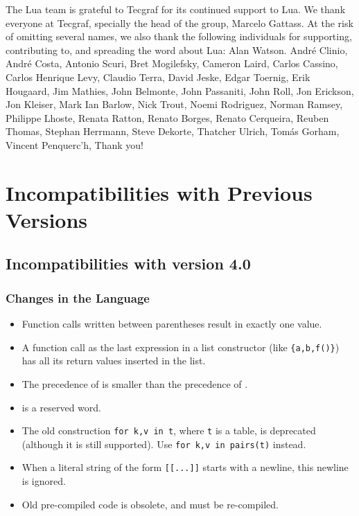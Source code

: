 \documentclass[11pt,twoside]{article}
\makeatletter
\def\tecgraf{{\sf Tecgraf}}
\newcommand{\Index}[1]{#1\index{#1@{\lowercase{#1}}}}
\makeatother
\begin{document}
The Lua team is grateful to \tecgraf{} for its continued support to Lua.
We thank everyone at \tecgraf{},
specially the head of the group, Marcelo Gattass.
At the risk of omitting several names,
we also thank the following individuals for supporting,
contributing to, and spreading the word about Lua:
Alan Watson.
Andr\'e Clinio,
Andr\'e Costa,
Antonio Scuri,
Bret Mogilefsky,
Cameron Laird,
Carlos Cassino,
Carlos Henrique Levy,
Claudio Terra,
David Jeske,
Edgar Toernig,
Erik Hougaard,
Jim Mathies,
John Belmonte,
John Passaniti,
John Roll,
Jon Erickson,
Jon Kleiser,
Mark Ian Barlow,
Nick Trout,
Noemi Rodriguez,
Norman Ramsey,
Philippe Lhoste,
Renata Ratton,
Renato Borges,
Renato Cerqueira,
Reuben Thomas,
Stephan Herrmann,
Steve Dekorte,
Thatcher Ulrich,
Tom\'as Gorham,
Vincent Penquerc'h,
Thank you!


\appendix

\section*{Incompatibilities with Previous Versions}

\subsection*{Incompatibilities with \Index{version 4.0}}

\subsubsection*{Changes in the Language}
\begin{itemize}

\item
Function calls written between parentheses result in exactly one value.

\item
A function call as the last expression in a list constructor
(like \verb|{a,b,f()}|) has all its return values inserted in the list.

\item
The precedence of  is smaller than the precedence of .

\item
{} is a reserved word.

\item
The old construction \verb|for k,v in t|, where \verb|t| is a table,
is deprecated (although it is still supported).
Use \verb|for k,v in pairs(t)| instead.

\item
When a literal string of the form \verb|[[...]]| starts with a newline,
this newline is ignored.

\item Old pre-compiled code is obsolete, and must be re-compiled.

\end{itemize}
\end{document}
